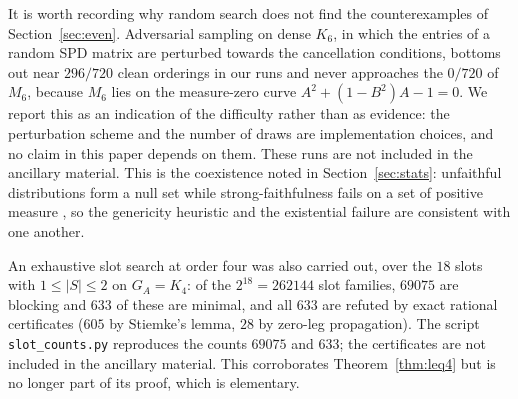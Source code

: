 \documentclass[11pt]{article}
\theoremstyle{plain}
\theoremstyle{definition}
\theoremstyle{remark}
\begin{document}
\begin{humanblock}
It is worth recording why random search does not find the counterexamples of
Section~\ref{sec:even}. Adversarial sampling on dense $K_6$, in which the entries of a random SPD matrix are
perturbed towards the cancellation conditions, bottoms out near $296/720$ clean orderings in our runs
and never approaches the $0/720$ of $M_6$, because $M_6$ lies on the measure-zero curve $A^2+(1-B^2)A-1=0$. We report this as an
indication of the difficulty rather than as evidence: the perturbation scheme and the number of draws
are implementation choices, and no claim in this paper depends on them. These runs are not
included in the ancillary material. This is the coexistence noted
in Section~\ref{sec:stats}: unfaithful distributions form a null set while strong-faithfulness fails on
a set of positive measure \cite{Uhler}, so the genericity heuristic and the existential failure are
consistent with one another.

An exhaustive slot search at order four was also carried out, over the $18$ slots with
$1\le|S|\le2$ on $G_A=K_4$: of the $2^{18}=262144$ slot families, $69075$ are blocking and $633$
of these are minimal, and all $633$ are refuted by exact rational certificates ($605$ by Stiemke's
lemma, $28$ by zero-leg propagation). The script \texttt{slot\_counts.py} reproduces the counts $69075$
and $633$; the certificates are not included in the ancillary material. This corroborates Theorem~\ref{thm:leq4} but is no longer
part of its proof, which is elementary.
\end{humanblock}



\end{document}
